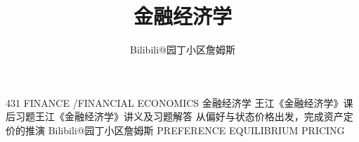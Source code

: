 \documentclass[fontset=none]{exam-zh}
\title{金融经济学}
\author{Bilibili@园丁小区詹姆斯}
\def\WJHandoutKnowledge{}
\begin{document}
\FourThreeOneFrontMatter

\ifdefined\FourThreeOnePrintInterior
\else
\MakeFourThreeOneCover
    {431 FINANCE \quad/\quad FINANCIAL ECONOMICS}
    {金融经济学}
    {\ifdefined\WJExercisesOnly 王江《金融经济学》课后习题\else 王江《金融经济学》讲义及习题解答\fi}
    {从偏好与状态价格出发，完成资产定价的推演}
    {Bilibili@园丁小区詹姆斯}
    {PREFERENCE \quad EQUILIBRIUM \quad PRICING}

\null
\thispagestyle{empty}
\fi

\setlength{\cftsubsubsecnumwidth}{4.5em}
\MakeFourThreeOneContents[3]

\cleardoublepage

\ifdefined\WJHandoutKnowledge
  \setcounter{chapter}{0}
  
\else
  \setcounter{chapter}{1}
\fi














\end{document}
